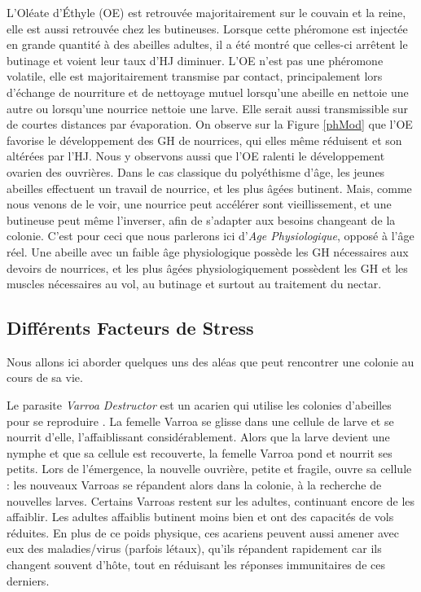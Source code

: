 			 L'Oléate d'Éthyle (OE) est retrouvée majoritairement sur le couvain et la reine, elle est aussi retrouvée chez les butineuses. Lorsque cette phéromone est injectée en grande quantité à des abeilles adultes, il a été montré que celles-ci arrêtent le butinage et voient leur taux d'HJ diminuer. L'OE n'est pas une phéromone volatile, elle est majoritairement transmise par contact, principalement lors d'échange de nourriture et de nettoyage mutuel lorsqu'une abeille en nettoie une autre ou lorsqu'une nourrice nettoie une larve. Elle serait aussi transmissible sur de courtes distances par évaporation. On observe sur la Figure \ref{phMod} que l'OE favorise le développement des GH de nourrices, qui elles même réduisent et son altérées par l'HJ. Nous y observons aussi que l'OE ralenti le développement ovarien des ouvrières. Dans le cas classique du polyéthisme d'âge, les jeunes abeilles effectuent un travail de nourrice, et les plus âgées butinent. Mais, comme nous venons de le voir, une nourrice peut accélérer sont vieillissement, et une butineuse peut même l'inverser, afin de s'adapter aux besoins changeant de la colonie. C'est pour ceci que nous parlerons ici d'\textit{Age Physiologique}, opposé à l'âge réel. Une abeille avec un faible âge physiologique possède les GH nécessaires aux devoirs de nourrices, et les plus âgées physiologiquement possèdent les GH et les muscles nécessaires au vol, au butinage et surtout au traitement du nectar.
			
		\subsection{Différents Facteurs de Stress}
		Nous allons ici aborder quelques uns des aléas que peut rencontrer une colonie au cours de sa vie.
		
		Le parasite \textit{Varroa Destructor} est un acarien qui utilise les colonies d'abeilles pour se reproduire \cite{le_conte_varroa_2010}. La femelle Varroa se glisse dans une cellule de larve et se nourrit d'elle, l'affaiblissant considérablement. Alors que la larve devient une nymphe et que sa cellule est recouverte, la femelle Varroa pond et nourrit ses petits. Lors de l'émergence, la nouvelle ouvrière, petite et fragile, ouvre sa cellule : les nouveaux Varroas se répandent alors dans la colonie, à la recherche de nouvelles larves. Certains Varroas restent sur les adultes, continuant encore de les affaiblir. Les adultes affaiblis butinent moins bien et ont des capacités de vols réduites. En plus de ce poids physique, ces acariens peuvent aussi amener avec eux des maladies/virus (parfois létaux), qu'ils répandent rapidement car ils changent souvent d'hôte, tout en réduisant les réponses immunitaires de ces derniers.
		

